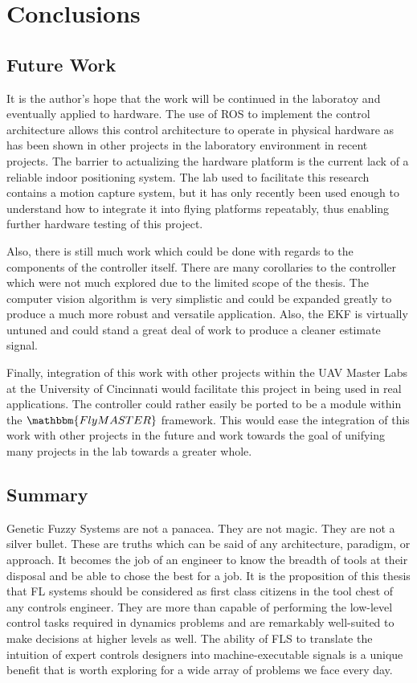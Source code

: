 \chapter{Conclusions}

\section{Future Work}
It is the author's hope that the work will be continued in the laboratoy and eventually applied to hardware.
The use of ROS to implement the control architecture allows this control architecture to operate in physical
hardware as has been shown in other projects in the laboratory environment in recent projects. The barrier to
actualizing the hardware platform is the current lack of a reliable indoor positioning system. The lab used to
facilitate this research contains a motion capture system, but it has only recently been used enough to
understand how to integrate it into flying platforms repeatably, thus enabling further hardware testing of
this project.

Also, there is still much work which could be done with regards to the components of the controller itself.
There are many corollaries to the controller which were not much explored due to the limited scope of the
thesis. The computer vision algorithm is very simplistic and could be expanded greatly to produce a much more
robust and versatile application. Also, the EKF is virtually untuned and could stand a great deal of work to
produce a cleaner estimate signal.

Finally, integration of this work with other projects within the UAV Master Labs at the University of
Cincinnati would facilitate this project in being used in real applications. The controller could rather
easily be ported to be a module within the  $\mathbbm{FlyMASTER}$ framework. This would ease the integration
of this work with other projects in the future and work towards the goal of unifying many projects in the lab
towards a greater whole.

\section{Summary}
Genetic Fuzzy Systems are not a panacea. They are not magic. They are not a silver bullet. These are truths
which can be said of any architecture, paradigm, or approach. It becomes the job of an engineer to know the
breadth of tools at their disposal and be able to chose the best for a job. It is the proposition of this
thesis that FL systems should be considered as first class citizens in the tool chest of any controls
engineer. They are more than capable of performing the low-level control tasks required in dynamics problems
and are remarkably well-suited to make decisions at higher levels as well. The ability of FLS to translate the
intuition of expert controls designers into machine-executable signals is a unique benefit that is worth
exploring for a wide array of problems we face every day.

